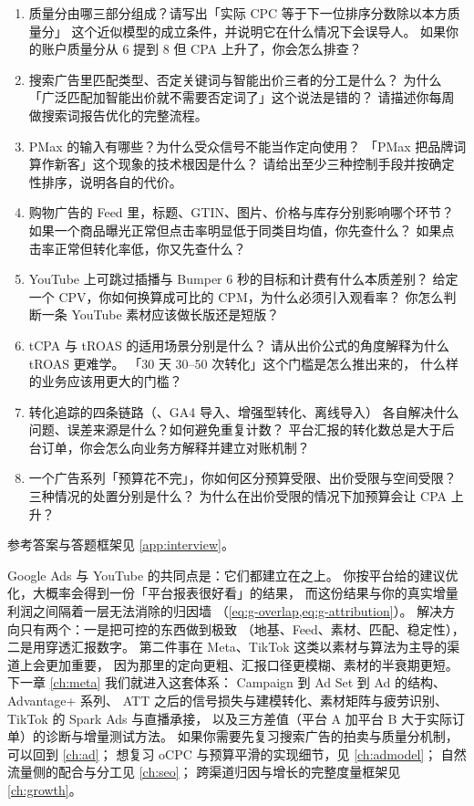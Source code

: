 \begin{interview}[本章对应的面试题]
\begin{enumerate}
  \item 质量分由哪三部分组成？请写出「实际 CPC 等于下一位排序分数除以本方质量分」
        这个近似模型的成立条件，并说明它在什么情况下会误导人。
        如果你的账户质量分从 6 提到 8 但 CPA 上升了，你会怎么排查？
  \item 搜索广告里匹配类型、否定关键词与智能出价三者的分工是什么？
        为什么「广泛匹配加智能出价就不需要否定词了」这个说法是错的？
        请描述你每周做搜索词报告优化的完整流程。
  \item PMax 的输入有哪些？为什么受众信号不能当作定向使用？
        「PMax 把品牌词算作新客」这个现象的技术根因是什么？
        请给出至少三种控制手段并按确定性排序，说明各自的代价。
  \item 购物广告的 Feed 里，标题、GTIN、图片、价格与库存分别影响哪个环节？
        如果一个商品曝光正常但点击率明显低于同类目均值，你先查什么？
        如果点击率正常但转化率低，你又先查什么？
  \item YouTube 上可跳过插播与 Bumper 6 秒的目标和计费有什么本质差别？
        给定一个 CPV，你如何换算成可比的 CPM，为什么必须引入观看率？
        你怎么判断一条 YouTube 素材应该做长版还是短版？
  \item tCPA 与 tROAS 的适用场景分别是什么？
        请从出价公式的角度解释为什么 tROAS 更难学。
        「30 天 30--50 次转化」这个门槛是怎么推出来的，
        什么样的业务应该用更大的门槛？
  \item 转化追踪的四条链路（、GA4 导入、增强型转化、离线导入）
        各自解决什么问题、误差来源是什么？如何避免重复计数？
        平台汇报的转化数总是大于后台订单，你会怎么向业务方解释并建立对账机制？
  \item 一个广告系列「预算花不完」，你如何区分预算受限、出价受限与空间受限？
        三种情况的处置分别是什么？
        为什么在出价受限的情况下加预算会让 CPA 上升？
\end{enumerate}
参考答案与答题框架见 \cref{app:interview}。
\end{interview}

Google Ads 与 YouTube 的共同点是：它们都建立在之上。
你按平台给的建议优化，大概率会得到一份「平台报表很好看」的结果，
而这份结果与你的真实增量利润之间隔着一层无法消除的归因墙
（\cref{eq:g-overlap,eq:g-attribution}）。
解决方向只有两个：一是把可控的东西做到极致
（地基、Feed、素材、匹配、稳定性），二是用穿透汇报数字。
第二件事在 Meta、TikTok 这类以素材与算法为主导的渠道上会更加重要，
因为那里的定向更粗、汇报口径更模糊、素材的半衰期更短。
下一章 \cref{ch:meta} 我们就进入这套体系：
Campaign 到 Ad Set 到 Ad 的结构、Advantage+ 系列、
ATT 之后的信号损失与建模转化、素材矩阵与疲劳识别、
TikTok 的 Spark Ads 与直播承接，
以及三方差值（平台 A 加平台 B 大于实际订单）的诊断与增量测试方法。
如果你需要先复习搜索广告的拍卖与质量分机制，可以回到 \cref{ch:ad}；
想复习 oCPC 与预算平滑的实现细节，见 \cref{ch:admodel}；
自然流量侧的配合与分工见 \cref{ch:seo}；
跨渠道归因与增长的完整度量框架见 \cref{ch:growth}。
